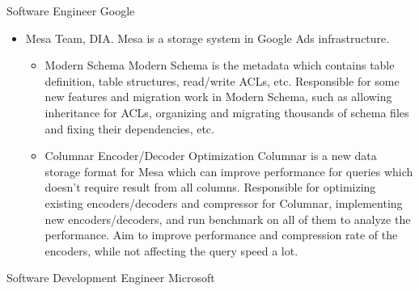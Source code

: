 \documentclass[10pt,a4paper,roman]{moderncv} %
\begin{document}
        {Software Engineer}
        {}
        {Google}
        {}
        {\begin{itemize}%
         \item Mesa Team, DIA.
               Mesa\footnotemark[2]{} is a storage system in Google Ads infrastructure.
               \begin{itemize}%
               \item Modern Schema\newline{}%
                     Modern Schema is the metadata which contains table definition, table structures, read/write ACLs, etc.\newline{}%
                     Responsible for some new features and migration work in Modern Schema, such as allowing inheritance for ACLs, organizing and migrating thousands of schema files and fixing their dependencies, etc.
               \item Columnar Encoder/Decoder Optimization\newline{}%
                     Columnar is a new data storage format for Mesa which can improve performance for queries which doesn't require result from all columns.\newline{}%
                     Responsible for optimizing existing encoders/decoders and compressor for Columnar, implementing new encoders/decoders, and run benchmark on all of them to analyze the performance.\newline{}%
                     Aim to improve performance and compression rate of the encoders, while not affecting the query speed a lot.
               \end{itemize}
         \end{itemize}}
        {Software Development Engineer}
        {}
        {Microsoft}
        {}
\end{document}
